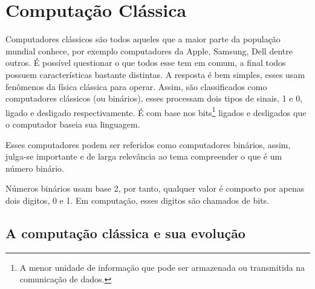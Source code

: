 \section{Computação Clássica} 
Computadores clássicos são todos aqueles que a maior parte da população mundial conhece, por exemplo computadores da Apple, Samsung, Dell dentre outros. É possível questionar o que todos esse tem em comum, a final todos possuem características bastante distintas. A resposta é bem simples, esses usam fenômenos da física clássica para operar. Assim, são classificados como computadores clássicos (ou binários), esses processam dois tipos de sinais, 1 e 0, ligado e desligado respectivamente. É com base nos \label{bits}bits\footnote{A menor unidade de informação que pode ser armazenada ou transmitida na comunicação de dados.} ligados e desligados que o computador baseia sua linguagem.

Esses computadores podem ser referidos como computadores binários, assim, julga-se importante e de larga relevância ao tema compreender o que é um número binário. 

Números binários usam base 2, por tanto, qualquer valor é composto por apenas dois digitos, 0 e 1. Em computação, esses digitos são chamados de bits. \cite{6}

\subsection{A computação clássica e sua evolução}
\newpage
